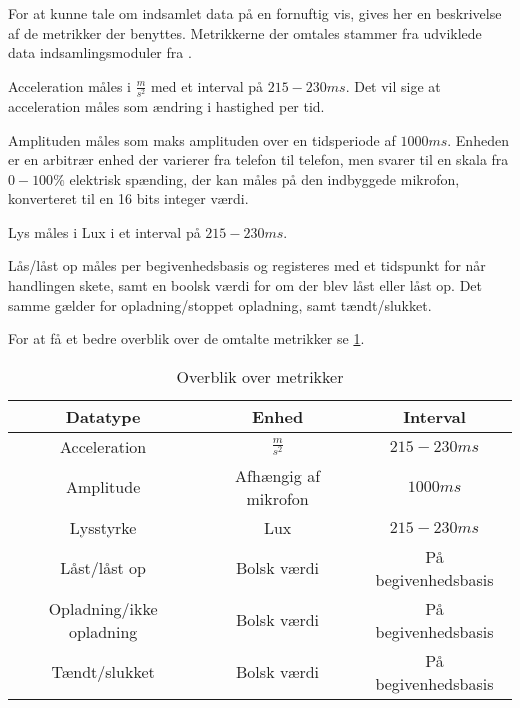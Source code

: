 For at kunne tale om indsamlet data på en fornuftig vis, gives her en beskrivelse af de metrikker der benyttes.
Metrikkerne der omtales stammer fra udviklede data indsamlingsmoduler fra \citet{misc:faellesrapp}.

Acceleration måles i $\frac{m}{s^2}$ med et interval på $215-230 ms$.
Det vil sige at acceleration måles som ændring i hastighed per tid.

Amplituden måles som maks amplituden over en tidsperiode af $1000ms$.
Enheden er en arbitrær enhed der varierer fra telefon til telefon, men svarer til en skala fra $0-100\%$ elektrisk spænding, der kan måles på den indbyggede mikrofon, konverteret til en 16 bits integer værdi.

Lys måles i Lux i et interval på $215-230 ms$.

Lås/låst op måles per begivenhedsbasis og registeres med et tidspunkt for når handlingen skete, samt en boolsk værdi for om der blev låst eller låst op.
Det samme gælder for opladning/stoppet opladning, samt tændt/slukket.

For at få et bedre overblik over de omtalte metrikker se \cref{tab:metrikker}.

\begin{table}[h]
\begin{tabular}{|c|c|c|}
	\hline Datatype & Enhed & Interval \\ 
	\hline Acceleration & $\frac{m}{s^2}$ & $215-230ms$ \\ 
	\hline Amplitude & Afhængig af mikrofon & $1000ms$ \\ 
	\hline Lysstyrke & Lux & $215-230ms$ \\ 
	\hline Låst/låst op & Bolsk værdi & På begivenhedsbasis \\ 
	\hline Opladning/ikke opladning & Bolsk værdi & På begivenhedsbasis \\ 
	\hline Tændt/slukket & Bolsk værdi & På begivenhedsbasis \\ 
	\hline 
\end{tabular}
\caption{Overblik over metrikker}\label{tab:metrikker} 
\end{table}